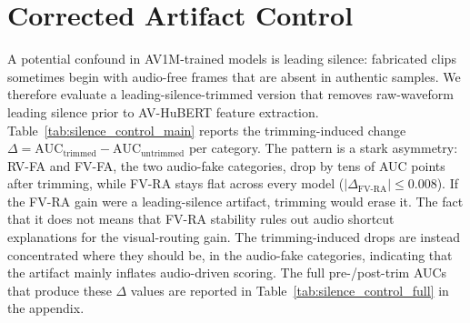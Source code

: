 \documentclass{article}
\newcommand{\method}{\textsc{TriRoute}}
\begin{document}
\begin{table}[h]
    \centering
    \caption{Post-hoc fusion: supervised \method\ + unsupervised kNN anomaly score, on FakeAVCeleb (FAVC) 70/30 test split and AV-Deepfake1M (AV1M) validation set. Values are percentages. Reported for completeness only; not a headline result.}
    \label{tab:posthoc_fusion}
\end{table}

\section{Corrected Artifact Control}
\label{app:artifact_control}

A potential confound in AV1M-trained models is leading silence: fabricated clips sometimes begin with audio-free frames that are absent in authentic samples. We therefore evaluate a leading-silence-trimmed version that removes raw-waveform leading silence prior to AV-HuBERT feature extraction. Table~\ref{tab:silence_control_main} reports the trimming-induced change $\Delta = \mathrm{AUC}_{\mathrm{trimmed}} - \mathrm{AUC}_{\mathrm{untrimmed}}$ per category. The pattern is a stark asymmetry: RV-FA and FV-FA, the two audio-fake categories, drop by tens of AUC points after trimming, while FV-RA stays flat across every model ($|\Delta_\mathrm{FV\text{-}RA}| \le 0.008$). If the FV-RA gain were a leading-silence artifact, trimming would erase it. The fact that it does not means that FV-RA stability rules out audio shortcut explanations for the visual-routing gain. The trimming-induced drops are instead concentrated where they should be, in the audio-fake categories, indicating that the artifact mainly inflates audio-driven scoring. The full pre-/post-trim AUCs that produce these $\Delta$ values are reported in Table~\ref{tab:silence_control_full} in the appendix.
\end{document}
